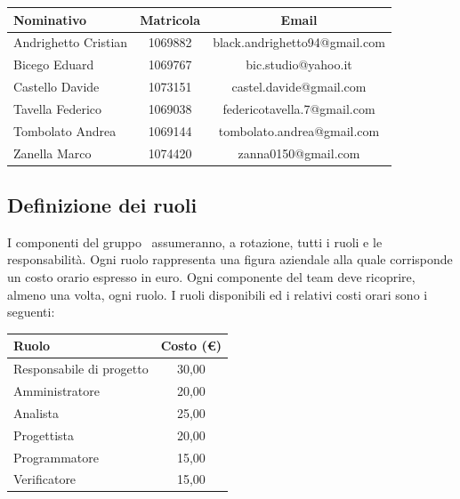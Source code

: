 \documentclass[PianoProgetto.tex]{subfiles}
\begin{document}
\begin{appendices}
\begin{table}[h]
		\begin{tabularx}{\textwidth}{lc C}
			\toprule
			\textbf{Nominativo} & \textbf{Matricola} & \textbf{Email} \\
			\midrule
			Andrighetto Cristian & 1069882 & black.andrighetto94@gmail.com \\
			Bicego Eduard & 1069767 & bic.studio@yahoo.it  \\
			Castello Davide	& 1073151 &	 castel.davide@gmail.com\\
			Tavella Federico & 1069038 & federicotavella.7@gmail.com\\
			Tombolato Andrea & 1069144 & tombolato.andrea@gmail.com	 \\
			Zanella Marco & 1074420 & zanna0150@gmail.com \\
			\bottomrule
		\end{tabularx}
		
		\end{table}		
		

	\subsection{Definizione dei ruoli}
	I componenti del gruppo \leaf\ assumeranno, a rotazione, tutti i ruoli e le responsabilità. Ogni ruolo rappresenta una figura aziendale alla quale corrisponde un costo orario espresso in euro. Ogni componente del team deve ricoprire, almeno una volta, ogni ruolo.
I ruoli disponibili ed i relativi costi orari sono i seguenti:

	\begin{table}[h]
	
		\begin{tabularx}{\textwidth}{X C}
			\toprule
			\textbf{Ruolo} & \textbf{Costo (\euro{})} \\
			\midrule
			Responsabile di progetto &  30,00	 \\
			Amministratore &  20,00	 \\
			Analista & 25,00	 \\
			Progettista &  20,00	 \\
			Programmatore & 15,00	 \\
			Verificatore & 15,00	 \\
			\bottomrule
		\end{tabularx}
		
		\end{table}		
\end{appendices}
\end{document}

